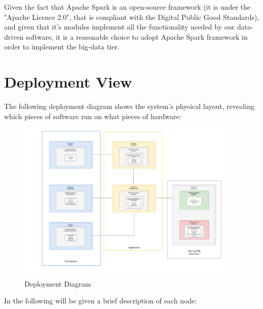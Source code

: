 \documentclass[10pt]{report}
\begin{document}
Given the fact that Apache Spark is an open-source framework (it is under the "Apache Licence 2.0", that is compliant with the Digital Public Good Standards), and given that it's modules implement all the functionality needed by our data-driven software, it is a reasonable choice to adopt Apache Spark framework in order to implement the big-data tier.

\section{Deployment View}
The following deployment diagram shows the system's physical layout, revealing which pieces of software run on what pieces of hardware:
\begin{figure}[H]
    \centering
    \includegraphics[width=400px]{Architecture/Deployment.jpg}
    \caption{Deployment Diagram}
\end{figure}
In the following will be given a brief description of each node:
\end{document}
